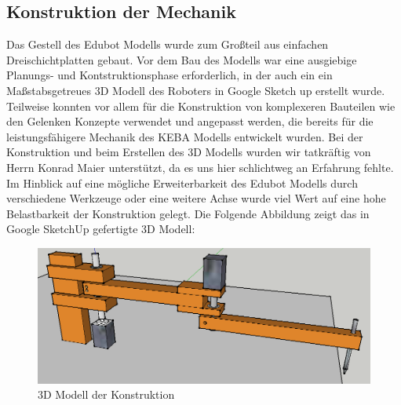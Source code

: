 \subsection{Konstruktion der Mechanik}
Das Gestell des Edubot Modells wurde zum Großteil aus einfachen Dreischichtplatten gebaut. Vor dem Bau des Modells war eine ausgiebige Planungs- und Kontstruktionsphase erforderlich, in der auch ein ein Maßstabsgetreues 3D Modell des Roboters in Google Sketch up erstellt wurde.
Teilweise konnten vor allem für die Konstruktion von komplexeren Bauteilen wie den Gelenken Konzepte verwendet und angepasst werden, die bereits für die leistungsfähigere Mechanik des KEBA Modells entwickelt wurden.
Bei der Konstruktion und beim Erstellen des 3D Modells wurden wir tatkräftig von Herrn Konrad Maier unterstützt, da es uns hier schlichtweg an Erfahrung fehlte.
Im Hinblick auf eine mögliche Erweiterbarkeit des Edubot Modells durch verschiedene Werkzeuge oder eine weitere Achse wurde viel Wert auf eine hohe Belastbarkeit der Konstruktion gelegt.
Die Folgende Abbildung zeigt das in Google SketchUp gefertigte 3D Modell:

\begin{figure}[H]
  \centering
  \begin{minipage}[t]{12 cm}
  	\centering
  	\includegraphics[width=12cm]{images/edubot_complete} 
    \caption{3D Modell der Konstruktion}
  \end{minipage}
\end{figure}

